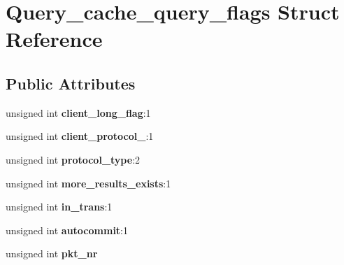 \hypertarget{structQuery__cache__query__flags}{}\section{Query\+\_\+cache\+\_\+query\+\_\+flags Struct Reference}
\label{structQuery__cache__query__flags}
\subsection*{Public Attributes}
\begin{DoxyCompactItemize}
\item 
\mbox{\label{structQuery__cache__query__flags_a69bad145051ede623ca733dd9abdb625}} 
unsigned int {\bfseries client\+\_\+long\+\_\+flag}\+:1
\item 
\mbox{\label{structQuery__cache__query__flags_aa7035d17db7f8dfdc6e0558725dc90c2}} 
unsigned int {\bfseries client\+\_\+protocol\+\_}\+:1
\item 
\mbox{\label{structQuery__cache__query__flags_af21875c08dcb346c94b8658d235be8ca}} 
unsigned int {\bfseries protocol\+\_\+type}\+:2
\item 
\mbox{\label{structQuery__cache__query__flags_a61f4913f3ce95ad1b48a4372fff4700c}} 
unsigned int {\bfseries more\+\_\+results\+\_\+exists}\+:1
\item 
\mbox{\label{structQuery__cache__query__flags_a03d8b1306e2b42be101a63483191c248}} 
unsigned int {\bfseries in\+\_\+trans}\+:1
\item 
\mbox{\label{structQuery__cache__query__flags_a0689f91b065838b9bc73439f1caad993}} 
unsigned int {\bfseries autocommit}\+:1
\item 
\mbox{\label{structQuery__cache__query__flags_a48e6399c11ec374662d08f9cf9a36275}} 
unsigned int {\bfseries pkt\+\_\+nr}
\item 
\mbox{\label{structQuery__cache__query__flags_a1e020496a9e53a0a5425c042a939f4f6}} 

\end{DoxyCompactItemize}
